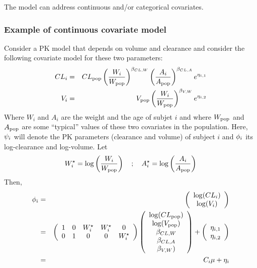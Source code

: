 The model can address continuous and/or categorical covariates.


\subsubsection{Example of continuous covariate model} \label{section_model_contcov}
Consider a PK model that depends on volume and clearance and consider the following covariate model for these two parameters:
\begin{eqnarray*}
CL_i & = & CL_{\rm pop}\left(\frac{W_i}{W_{\rm pop}}\right)^{\beta_{CL,W}} \left(\frac{A_i}{A_{\rm pop}}\right)^{\beta_{CL,A}} e^{\eta_{i,1}} \\
V_i & = & V_{\rm pop}\left(\frac{W_i}{W_{\rm pop}}\right)^{\beta_{V,W}}  e^{\eta_{i,2}}
\end{eqnarray*}
Where $W_i$ and $A_i$ are the weight and the age of subjet $i$ and where $W_{\rm pop}$ and $A_{\rm pop}$ are some ``typical'' values of these two covariates in the population. Here,
${\psi_i}$ will denote the PK parameters (clearance and volume) of subject $i$ and
${{\phi}_i}$ its log-clearance and log-volume.
Let
$$W^\star_i = \log\left(\frac{W_i}{W_{\rm pop}}\right) \quad ; \quad A^\star_i = \log\left(\frac{A_i}{A_{\rm pop}}\right) $$
Then,
\begin{eqnarray*}
\phigi &= & \left( \begin{array}{c}  \log(CL_i) \\  \log(V_i) \\ \end{array} \right) \\
&=& \left( \begin{array}{ccccc}  1 & 0 & W^\star_i & W^\star_i & 0 \\ 0 & 1 & 0 & 0 & W^\star_i \\ \end{array} \right)
\left( \begin{array}{c}  \log(CL_{\rm pop}) \\  \log(V_{\rm pop}) \\ \beta_{CL,W} \\ \beta_{CL,A} \\ \beta_{V,W} ) \\ \end{array} \right)
+  \left( \begin{array}{c}  \eta_{i,1} \\  \eta_{i,2} \\ \end{array} \right) \\
&=& \Covariate_i \fixed_effect + \etagi
\end{eqnarray*}

